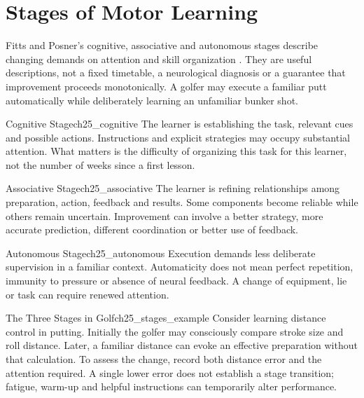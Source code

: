 \section{Stages of Motor Learning}
\label{sec:ch25_stages}

Fitts and Posner's cognitive, associative and autonomous stages describe changing demands on attention and skill organization \citep{fitts1967human}. They are useful descriptions, not a fixed timetable, a neurological diagnosis or a guarantee that improvement proceeds monotonically. A golfer may execute a familiar putt automatically while deliberately learning an unfamiliar bunker shot.

\begin{definition}{Cognitive Stage}{ch25_cognitive}
The learner is establishing the task, relevant cues and possible actions. Instructions and explicit strategies may occupy substantial attention. What matters is the difficulty of organizing this task for this learner, not the number of weeks since a first lesson.
\end{definition}

\begin{definition}{Associative Stage}{ch25_associative}
The learner is refining relationships among preparation, action, feedback and results. Some components become reliable while others remain uncertain. Improvement can involve a better strategy, more accurate prediction, different coordination or better use of feedback.
\end{definition}

\begin{definition}{Autonomous Stage}{ch25_autonomous}
Execution demands less deliberate supervision in a familiar context. Automaticity does not mean perfect repetition, immunity to pressure or absence of neural feedback. A change of equipment, lie or task can require renewed attention.
\end{definition}

\begin{example}{The Three Stages in Golf}{ch25_stages_example}
Consider learning distance control in putting. Initially the golfer may consciously compare stroke size and roll distance. Later, a familiar distance can evoke an effective preparation without that calculation. To assess the change, record both distance error and the attention required. A single lower error does not establish a stage transition; fatigue, warm-up and helpful instructions can temporarily alter performance.
\end{example}

